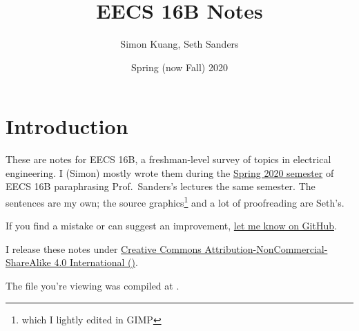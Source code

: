 \documentclass{../content16b}
\begin{document}
\title{EECS 16B Notes}
\author{Simon Kuang, Seth Sanders}
\date{Spring (now Fall) 2020}
\frontmatter
\maketitle

\section{Introduction}
These are notes for EECS 16B, a freshman-level survey of topics in electrical engineering. I (Simon) mostly wrote them during the \href{https://inst.eecs.berkeley.edu/~ee16b/sp20/}{Spring 2020 semester} of EECS 16B paraphrasing Prof.~Sanders's lectures the same semester.
The sentences are my own; the source graphics\footnote{which I lightly edited in GIMP} and a lot of proofreading are Seth's.

If you find a mistake or can suggest an improvement, \href{https://github.com/simontheflutist/eecs16b-notes}{let me know on GitHub}.

I release these notes under \href{https://creativecommons.org/licenses/by-nc-sa/4.0/}{Creative Commons Attribution-NonCommercial-ShareAlike 4.0 International (\ccbyncsa)}.

The file you're viewing was compiled at \DTMnow.

\newpage
\tableofcontents
\newpage
\listoffigures

\mainmatter
\renewcommand{\printchaptername}{\chapnamefont Lecture}










\end{document}
